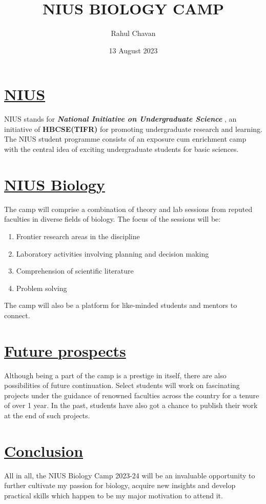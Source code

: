 \documentclass{article}
\title{NIUS BIOLOGY CAMP}
\author{Rahul Chavan}
\date{13 August 2023 }
\begin{document}
\maketitle

\section*{\underline{NIUS}}

NIUS stands for \textbf{\textit{National Initiative on Undergraduate Science }}, an initiative
of \textbf{HBCSE(TIFR)} for promoting undergraduate research and learning.
The NIUS student programme consists of an exposure cum enrichment camp 
with the central idea of exciting undergraduate students for basic sciences.

\section*{\underline{NIUS Biology}} 
The camp will comprise a combination of theory and lab sessions from reputed faculties in diverse fields of biology.
The focus of the sessions will be:
\begin{enumerate}
    \item Frontier research areas in the discipline
    \item Laboratory activities involving planning and decision making
    \item Comprehension of scientific literature 
    \item Problem solving
\end{enumerate}
The camp will also be a platform for like-minded students and mentors to connect.

\section*{\underline{Future prospects}}

Although being a part of the camp is a prestige in itself, there are also possibilities of future continuation.
 Select students will work on fascinating projects under the guidance of renowned faculties across the country for a tenure of over 1 year. 
 In the past, students have also got a chance to publish their work at the end of such projects.

\section*{\underline{Conclusion}}
All in all, the NIUS Biology Camp 2023-24 will be an invaluable opportunity to further cultivate my passion 
for biology, acquire new insights and develop practical skills which happen to be my major motivation to attend it.
\end{document}
